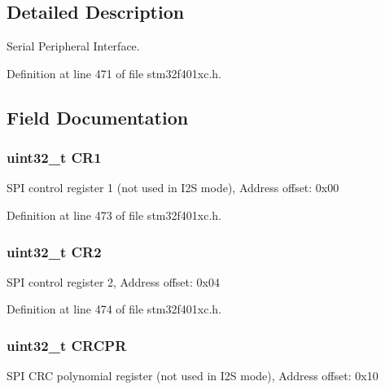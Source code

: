\subsection{Detailed Description}
Serial Peripheral Interface. 

Definition at line 471 of file stm32f401xc.\+h.



\subsection{Field Documentation}
\subsubsection[{\texorpdfstring{C\+R1}{CR1}}]{ uint32\+\_\+t C\+R1}\hypertarget{struct_s_p_i___type_def_ab0ec7102960640751d44e92ddac994f0}{}\label{struct_s_p_i___type_def_ab0ec7102960640751d44e92ddac994f0}
S\+PI control register 1 (not used in I2S mode), Address offset\+: 0x00 

Definition at line 473 of file stm32f401xc.\+h.

\subsubsection[{\texorpdfstring{C\+R2}{CR2}}]{ uint32\+\_\+t C\+R2}\hypertarget{struct_s_p_i___type_def_afdfa307571967afb1d97943e982b6586}{}\label{struct_s_p_i___type_def_afdfa307571967afb1d97943e982b6586}
S\+PI control register 2, Address offset\+: 0x04 

Definition at line 474 of file stm32f401xc.\+h.

\subsubsection[{\texorpdfstring{C\+R\+C\+PR}{CRCPR}}]{ uint32\+\_\+t C\+R\+C\+PR}\hypertarget{struct_s_p_i___type_def_ace450027b4b33f921dd8edd3425a717c}{}\label{struct_s_p_i___type_def_ace450027b4b33f921dd8edd3425a717c}
S\+PI C\+RC polynomial register (not used in I2S mode), Address offset\+: 0x10 

